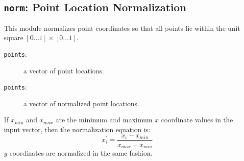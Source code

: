 \subsection{{\tt{norm}}: Point Location Normalization\label{s:toys-norm}}

This module normalizes point coordinates so that all points lie within the unit square $[0{\ldots}1]{\times}[0{\ldots}1]$.

{}

\begin{description}
\item[{\tt{points}}:]
	a vector of point locations.
\end{description}

{\outputspec}

\begin{description}
\item[{\tt{points}}:]
	a vector of normalized point locations.
\end{description}

If $x_{min}$ and $x_{max}$ are the minimum and maximum $x$ coordinate values in the input vector,
then the normalization equation is:
\[	x_{i}^{\prime} = \frac{x_i - x_{min}}{x_{max} - x_{min}}	\]
$y$ coordinates are normalized in the same fashion.
